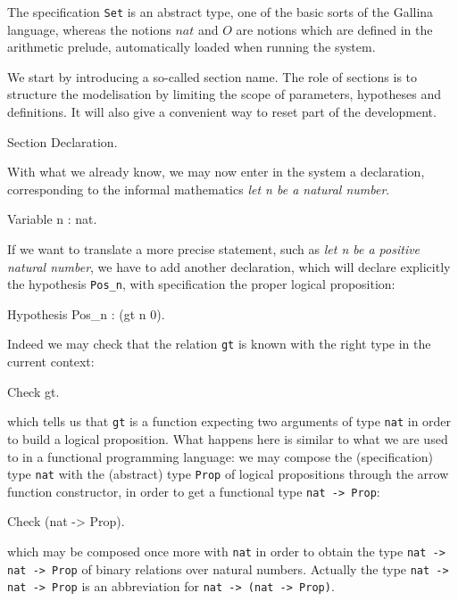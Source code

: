 \documentclass[11pt,a4paper]{book}
\begin{document}
The specification \verb:Set: is an abstract type, one of the basic
sorts of the Gallina language, whereas the notions $nat$ and $O$ are
notions which are defined in the arithmetic prelude,
automatically loaded when running the \Coq{} system.

We start by introducing a so-called section name. The role of sections
is to structure the modelisation by limiting the scope of parameters,
hypotheses and definitions. It will also give a convenient way to
reset part of the development.

\begin{coq_example}
Section Declaration.
\end{coq_example}
With what we already know, we may now enter in the system a declaration,
corresponding to the informal mathematics {\sl let n be a natural
  number}.

\begin{coq_example}
Variable n : nat.
\end{coq_example}

If we want to translate a more precise statement, such as
{\sl let n be a positive natural number},
we have to add another declaration, which will declare explicitly the
hypothesis \verb:Pos_n:, with specification the proper logical
proposition:
\begin{coq_example}
Hypothesis Pos_n : (gt n 0).
\end{coq_example}

Indeed we may check that the relation \verb:gt: is known with the right type
in the current context:

\begin{coq_example}
Check gt.
\end{coq_example}

which tells us that \texttt{gt} is a function expecting two arguments of
type \texttt{nat} in order to build a logical proposition.
What happens here is similar to what we are used to in a functional
programming language: we may compose the (specification) type \texttt{nat}
with the (abstract) type \texttt{Prop} of logical propositions through the
arrow function constructor, in order to get a functional type
\texttt{nat -> Prop}:
\begin{coq_example}
Check (nat -> Prop).
\end{coq_example}
which may be composed once more with \verb:nat: in order to obtain the
type \texttt{nat -> nat -> Prop} of binary relations over natural numbers.
Actually the type \texttt{nat -> nat -> Prop} is an abbreviation for
\texttt{nat -> (nat -> Prop)}.
\end{document}
